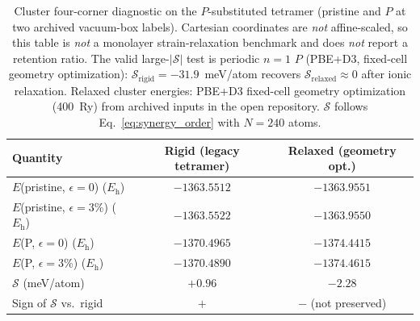 



\begin{table}[!ht]
\caption{\label{tab:relaxext}Cluster four-corner diagnostic on the $P$-substituted tetramer (pristine and $P$ at two archived vacuum-box labels). Cartesian coordinates are \emph{not} affine-scaled, so this table is \emph{not} a monolayer strain-relaxation benchmark and does \emph{not} report a retention ratio.
The valid large-$|\mathcal{S}|$ test is periodic $n{=}1$ $P$ (PBE+D3, fixed-cell geometry optimization): $\mathcal{S}_{\mathrm{rigid}}=-31.9$~meV/atom recovers $\mathcal{S}_{\mathrm{relaxed}}{\approx}0$ after ionic relaxation.
Relaxed cluster energies: PBE+D3 fixed-cell geometry optimization (400~Ry) from archived inputs in the open repository.
$\mathcal{S}$ follows Eq.~\eqref{eq:synergy_order} with $N{=}240$ atoms.}
\begin{ruledtabular}
\begin{tabular}{lcc}
Quantity & Rigid (legacy tetramer) & Relaxed (geometry opt.) \\
\hline
$E$(pristine, $\epsilon{=}0$) ($E_{\mathrm{h}}$) & $-1363.5512$ & $-1363.9551$ \\
$E$(pristine, $\epsilon{=}3$\%) ($E_{\mathrm{h}}$) & $-1363.5522$ & $-1363.9550$ \\
$E$(P, $\epsilon{=}0$) ($E_{\mathrm{h}}$) & $-1370.4965$ & $-1374.4415$ \\
$E$(P, $\epsilon{=}3$\%) ($E_{\mathrm{h}}$) & $-1370.4890$ & $-1374.4615$ \\
$\mathcal{S}$ (meV/atom) & $+0.96$ & $-2.28$ \\
Sign of $\mathcal{S}$ vs.\ rigid & $+$ & $-$ (not preserved) \\
\end{tabular}
\end{ruledtabular}
\end{table}

